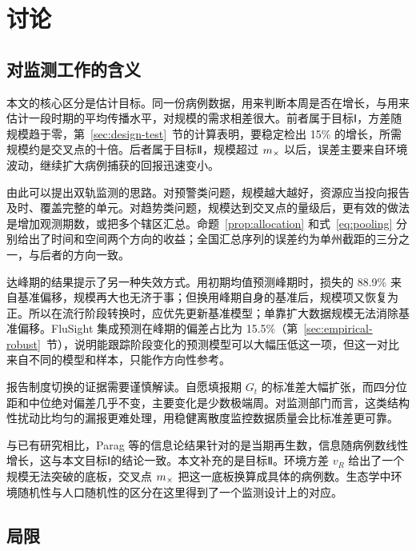\section{讨论}
\label{sec:discussion}

\subsection{对监测工作的含义}
\label{sec:discussion-implications}

本文的核心区分是估计目标。同一份病例数据，用来判断本周是否在增长，与用来估计一段时期的平均传播水平，对规模的需求相差很大。前者属于目标Ⅰ，方差随规模趋于零，第~\ref{sec:design-test}~节的计算表明，要稳定检出 15\% 的增长，所需规模约是交叉点的十倍。后者属于目标Ⅱ，规模超过 $m_{\times}$ 以后，误差主要来自环境波动，继续扩大病例捕获的回报迅速变小。

由此可以提出双轨监测的思路。对预警类问题，规模越大越好，资源应当投向报告及时、覆盖完整的单元。对趋势类问题，规模达到交叉点的量级后，更有效的做法是增加观测期数，或把多个辖区汇总。命题~\ref{prop:allocation} 和式~\eqref{eq:pooling} 分别给出了时间和空间两个方向的收益；全国汇总序列的误差约为单州截距的三分之一，与后者的方向一致。

达峰期的结果提示了另一种失效方式。用初期均值预测峰期时，损失的 88.9\% 来自基准偏移，规模再大也无济于事；但换用峰期自身的基准后，规模项又恢复为正。所以在流行阶段转换时，应优先更新基准模型；单靠扩大数据规模无法消除基准偏移。FluSight 集成预测在峰期的偏差占比为 15.5\%（第~\ref{sec:empirical-robust}~节），说明能跟踪阶段变化的预测模型可以大幅压低这一项，但这一对比来自不同的模型和样本，只能作方向性参考。

报告制度切换的证据需要谨慎解读。自愿填报期 $G_t$ 的标准差大幅扩张，而四分位距和中位绝对偏差几乎不变，主要变化是少数极端周。对监测部门而言，这类结构性扰动比均匀的漏报更难处理，用稳健离散度监控数据质量会比标准差更可靠。

与已有研究相比，Parag 等的信息论结果针对的是当期再生数，信息随病例数线性增长\citep{parag2022quantifying, parag2022fundamental}，这与本文目标Ⅰ的结论一致。本文补充的是目标Ⅱ。环境方差 $v_R$ 给出了一个规模无法突破的底板，交叉点 $m_{\times}$ 把这一底板换算成具体的病例数。生态学中环境随机性与人口随机性的区分\citep{engen1998demographic, rohani2002determinism}在这里得到了一个监测设计上的对应。

\subsection{局限}
\label{sec:discussion-limits}

